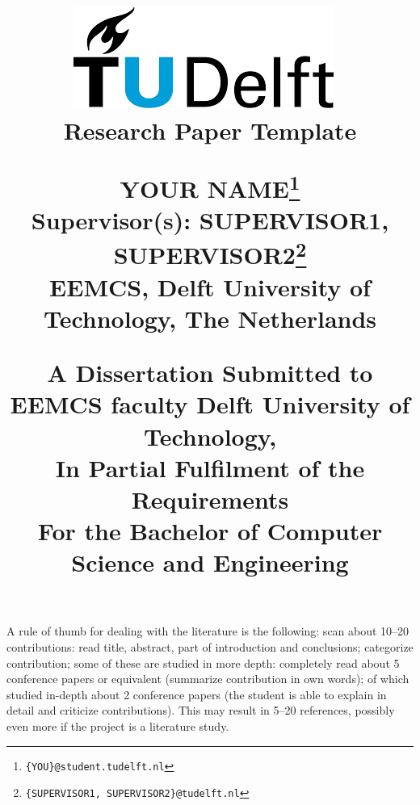 \documentclass{article}
\title{

\includegraphics{tudelftlogo.png}~
\\[3cm]
Research Paper Template

\vspace{1.5cm}


YOUR NAME\footnote{\texttt{\{YOU\}@student.tudelft.nl}}\\
Supervisor(s): SUPERVISOR1, SUPERVISOR2\footnote{\texttt{\{SUPERVISOR1, SUPERVISOR2\}@tudelft.nl}}\\
EEMCS, Delft University of Technology, The Netherlands

\vspace{7cm}


A Dissertation Submitted to EEMCS faculty Delft University of Technology,\\
In Partial Fulfilment of the Requirements\\
For the Bachelor of Computer Science and Engineering
}
\begin{document}
\maketitle

\clearpage






















A rule of thumb for dealing with the literature is the following: scan about 10--20 contributions: read title, abstract, part of introduction and conclusions; categorize contribution; some of these are studied in more depth: completely read about 5 conference papers or equivalent (summarize contribution in own words); of which studied in-depth about 2 conference papers (the student is able to explain in detail and criticize contributions). This may result in 5--20 references, possibly even more if the project is a literature study.
\end{document}
